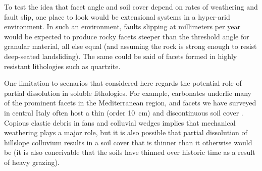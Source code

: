 
To test the idea that facet angle and soil cover depend on rates of weathering and fault slip, one place to look would be extensional systems in a hyper-arid environment. In such an environment, faults slipping at millimeters per year would be expected to produce rocky facets steeper than the threshold angle for granular material, all else equal (and assuming the rock is strong enough to resist deep-seated landsliding). The same could be said of facets formed in highly resistant lithologies such as quartzite.

One limitation to scenarios that considered here regards the potential role of partial dissolution in soluble lithologies. For example, carbonates underlie many of the prominent facets in the Mediterranean region, and facets we have surveyed in central Italy often host a thin (order 10~cm) and discontinuous soil cover \citep{tucker2011geomorphic}. Copious clastic debris in fans and colluvial wedges implies that mechanical weathering plays a major role, but it is also possible that partial dissolution of hillslope colluvium results in a soil cover that is thinner than it otherwise would be (it is also conceivable that the soils have thinned over historic time as a result of heavy grazing).

